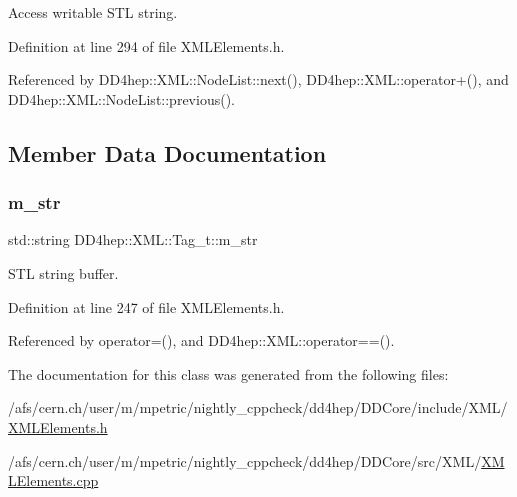 Access writable S\+TL string. 



Definition at line 294 of file X\+M\+L\+Elements.\+h.



Referenced by D\+D4hep\+::\+X\+M\+L\+::\+Node\+List\+::next(), D\+D4hep\+::\+X\+M\+L\+::operator+(), and D\+D4hep\+::\+X\+M\+L\+::\+Node\+List\+::previous().



\subsection{Member Data Documentation}
\hypertarget{class_d_d4hep_1_1_x_m_l_1_1_tag__t_aab9eff18240d6d98b8d8063792198e91}{}\label{class_d_d4hep_1_1_x_m_l_1_1_tag__t_aab9eff18240d6d98b8d8063792198e91} 
\subsubsection{\texorpdfstring{m\+\_\+str}{m\_str}}
{\footnotesize\ttfamily std\+::string D\+D4hep\+::\+X\+M\+L\+::\+Tag\+\_\+t\+::m\+\_\+str}



S\+TL string buffer. 



Definition at line 247 of file X\+M\+L\+Elements.\+h.



Referenced by operator=(), and D\+D4hep\+::\+X\+M\+L\+::operator==().



The documentation for this class was generated from the following files\+:\begin{DoxyCompactItemize}
\item 
/afs/cern.\+ch/user/m/mpetric/nightly\+\_\+cppcheck/dd4hep/\+D\+D\+Core/include/\+X\+M\+L/\hyperlink{_x_m_l_elements_8h}{X\+M\+L\+Elements.\+h}\item 
/afs/cern.\+ch/user/m/mpetric/nightly\+\_\+cppcheck/dd4hep/\+D\+D\+Core/src/\+X\+M\+L/\hyperlink{_x_m_l_elements_8cpp}{X\+M\+L\+Elements.\+cpp}\end{DoxyCompactItemize}
